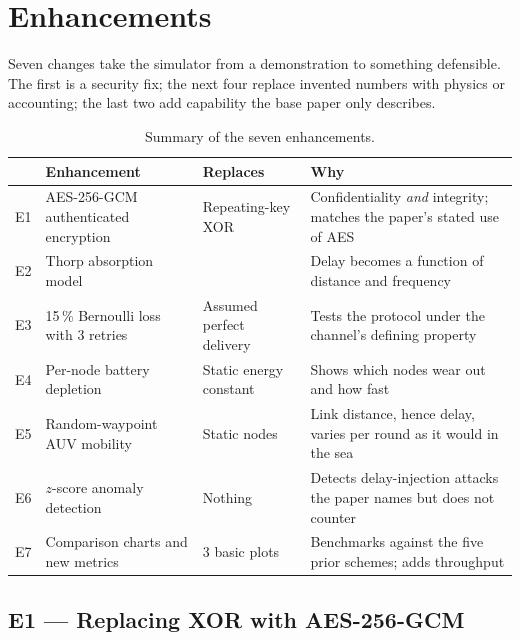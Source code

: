 \chapter{Enhancements}
\label{ch:improve}

Seven changes take the simulator from a demonstration to something defensible. The first is
a security fix; the next four replace invented numbers with physics or accounting; the last
two add capability the base paper only describes.

\begin{table}[H]
\centering
\caption{Summary of the seven enhancements.}
\label{tab:improvements}
\small
\begin{tabularx}{\textwidth}{@{}L{7mm} L{34mm} L{40mm} X@{}}
\toprule
& \textbf{Enhancement} & \textbf{Replaces} & \textbf{Why}\\
\midrule
E1 & AES-256-GCM authenticated encryption & Repeating-key XOR &
  Confidentiality \emph{and} integrity; matches the paper's stated use of AES\\
E2 & Thorp absorption model &  &
  Delay becomes a function of distance and frequency\\
E3 & 15\,\% Bernoulli loss with 3 retries & Assumed perfect delivery &
  Tests the protocol under the channel's defining property\\
E4 & Per-node battery depletion & Static energy constant &
  Shows which nodes wear out and how fast\\
E5 & Random-waypoint AUV mobility & Static nodes &
  Link distance, hence delay, varies per round as it would in the sea\\
E6 & $z$-score anomaly detection & Nothing &
  Detects delay-injection attacks the paper names but does not counter\\
E7 & Comparison charts and new metrics & 3 basic plots &
  Benchmarks against the five prior schemes; adds throughput\\
\bottomrule
\end{tabularx}
\end{table}

\section{E1 --- Replacing XOR with AES-256-GCM}
\label{sec:aes}

